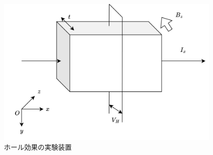 \begin{figure}
	\centering
	\includegraphics[width=0.8\linewidth]{src/figures/hall/hall.png}
	\caption{ホール効果の実験装置}\label{fig:hall-effect}
\end{figure}
